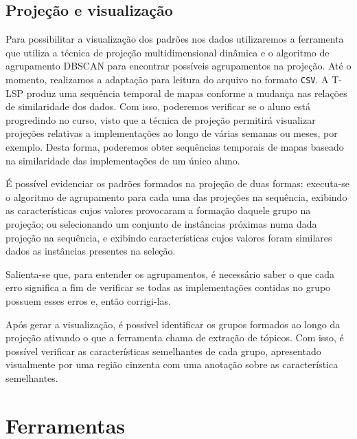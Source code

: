 		\subsection{Projeção e visualização}
			Para possibilitar a visualização dos padrões nos dados utilizaremos a
			ferramenta  \cite{Alencar-etal:2012} que utiliza a
			técnica de projeção multidimensional dinâmica \cite{Alencar} e o algoritmo
			de agrupamento \acs{DBSCAN} \cite{Ester1996} para encontrar possíveis
			agrupamentos na projeção. Até o momento, realizamos a adaptação para
			leitura do arquivo no formato \texttt{CSV}. A \acs{T-LSP} \cite{Alencar}
			produz uma sequência temporal de mapas conforme a mudança nas relações de
			similaridade dos dados. Com isso, poderemos verificar se o aluno está
			progredindo no curso, visto que a técnica de projeção permitirá visualizar
			projeções relativas a implementações ao longo de várias semanas ou meses,
			por exemplo. Desta forma, poderemos obter sequências temporais de mapas
			baseado na similaridade das implementações de um único aluno.
			
			É possível evidenciar os padrões formados na projeção de duas formas:
			executa-se o algoritmo de agrupamento para cada uma das projeções na
			sequência, exibindo as características cujos valores provocaram a formação
			daquele grupo na projeção; ou selecionando um conjunto de instâncias próximas
			numa dada projeção na sequência, e exibindo características cujos valores
			foram similares dados as instâncias presentes na seleção.
			
			Salienta-se que, para entender os agrupamentos, é necessário saber o que cada
			erro significa a fim de verificar se todas as implementações contidas no grupo
			possuem esses erros e, então corrigi-las.
			
			Após gerar a visualização, é possível identificar os grupos formados ao longo da
			projeção ativando o que a ferramenta chama de extração de tópicos. Com isso, é
			possível verificar as características semelhantes de cada grupo, apresentado
			visualmente por uma região cinzenta com uma anotação sobre as característica
			semelhantes.
			
		
	\section{Ferramentas}

